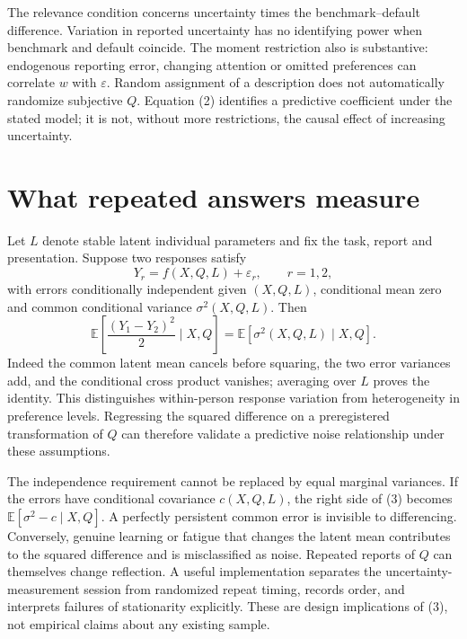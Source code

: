 \documentclass[11pt,a4paper]{article}
\newcommand{\E}{\mathbb E}
\begin{document}
The relevance condition concerns uncertainty times the benchmark--default difference. Variation in reported uncertainty has no identifying power when benchmark and default coincide. The moment restriction also is substantive: endogenous reporting error, changing attention or omitted preferences can correlate $w$ with $\varepsilon$. Random assignment of a description does not automatically randomize subjective $Q$. Equation (2) identifies a predictive coefficient under the stated model; it is not, without more restrictions, the causal effect of increasing uncertainty.

\section{What repeated answers measure}
Let $L$ denote stable latent individual parameters and fix the task, report and presentation. Suppose two responses satisfy
\[
 Y_r=f(X,Q,L)+\varepsilon_r,\qquad r=1,2,
\]
with errors conditionally independent given $(X,Q,L)$, conditional mean zero and common conditional variance $\sigma^2(X,Q,L)$. Then
\[
 \E\left[\frac{(Y_1-Y_2)^2}{2}\mid X,Q\right]
       =\E[\sigma^2(X,Q,L)\mid X,Q].                  \tag{3}
\]
Indeed the common latent mean cancels before squaring, the two error variances add, and the conditional cross product vanishes; averaging over $L$ proves the identity. This distinguishes within-person response variation from heterogeneity in preference levels. Regressing the squared difference on a preregistered transformation of $Q$ can therefore validate a predictive noise relationship under these assumptions.

The independence requirement cannot be replaced by equal marginal variances. If the errors have conditional covariance $c(X,Q,L)$, the right side of (3) becomes $\E[\sigma^2-c\mid X,Q]$. A perfectly persistent common error is invisible to differencing. Conversely, genuine learning or fatigue that changes the latent mean contributes to the squared difference and is misclassified as noise. Repeated reports of $Q$ can themselves change reflection. A useful implementation separates the uncertainty-measurement session from randomized repeat timing, records order, and interprets failures of stationarity explicitly. These are design implications of (3), not empirical claims about any existing sample.
\end{document}
